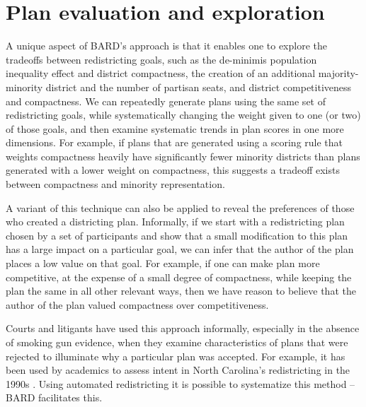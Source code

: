 \documentclass[article]{JSSstyle/jss}
\begin{document}
\section{Plan evaluation and exploration}

A unique aspect of BARD's approach is that it enables
one to explore the tradeoffs between redistricting goals, such as the
de{}-minimis population inequality effect and district
compactness, the creation of an additional majority{}-minority
district and the number of partisan seats, and district
competitiveness and compactness. We can repeatedly
generate plans using the same set of redistricting goals,
while systematically changing the weight given to
one (or two) of those goals, and then examine systematic trends in
plan scores in one more dimensions. For example, if plans that are generated
using a scoring rule that weights compactness heavily have
significantly fewer minority districts than plans generated with a
lower weight on compactness, this suggests a tradeoff exists
between compactness and minority representation.

A variant of this technique can also be applied to reveal the
preferences of those who created a districting plan. Informally, if we
start with a redistricting plan chosen by a set of participants and
show that a small modification to this plan has a large impact on 
a particular goal, we can infer that the author of the plan places a low
value on that goal. For example, if one can make plan more competitive, at the expense
of a small degree of compactness, while keeping the plan the same in all other
relevant ways, then we have reason to believe that the author of the plan 
valued compactness over competitiveness. 

Courts and litigants have used this approach informally, especially in the
absence of smoking gun evidence, when they examine characteristics of
plans that were rejected to illuminate why a particular plan was
accepted. For example, it has been used by academics to assess
intent in North Carolina's redistricting in the 1990s \citep[][]{GronWil99}. Using automated redistricting it is possible to
systematize this method -- BARD facilitates this. 
\end{document}
